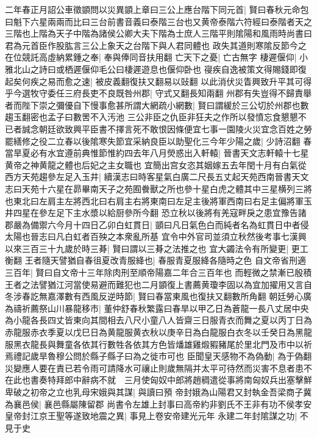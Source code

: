 二年春正月詔公車徵顗問以災異顗上章曰三公上應台階下同元首|{
	賢曰春秋元命包曰魁下六星兩兩而比曰三台前書音義曰泰階三台也又黄帝泰階六符經曰泰階者天之三階也上階為天子中階為諸侯公卿大夫下階為士庶人三階平則隂陽和風雨時尚書曰君為元首臣作股肱言三公上象天之台階下與人君同體也}
政失其道則寒隂反節今之在位競託高虛納累鍾之奉|{
	奉與俸同音扶用翻}
亡天下之憂|{
	亡古無字}
棲遲偃仰|{
	小雅北山之詩曰或栖遲偃仰毛公曰棲遲遊息也偃仰卧也}
寑疾自逸被策文得賜錢即復起矣何疾之易而愈之速|{
	被皮義翻復扶又翻易以䜴翻}
以此消伏災眚興致升平其可得乎今選牧守委任三府長吏不良既咎州郡|{
	守式又翻長知兩翻}
州郡有失豈得不歸責舉者而陛下崇之彌優自下慢事愈甚所謂大網疏小網數|{
	賢曰謂緩於三公切於州郡也數趨玉翻密也孟子曰數罟不入汚池}
三公非臣之仇臣非狂夫之作所以發憤忘食懇懇不已者誠念朝廷欲致興平臣書不擇言死不敢恨因條便宜七事一園陵火災宜念百姓之勞罷繕修之役二立春以後隂寒失節宜采納良臣以助聖化三今年少陽之歲|{
	少詩沼翻}
春當旱夏必有水宜遵前典惟節惟約四去年八月熒惑出入軒轅|{
	晉書天文志軒轅十七星黄帝之神黄龍之體也后妃之主女職也}
宜簡出宫女恣其姻嫁五去年閏十月有白氣從西方天苑趨參左足入玉井|{
	續漢志曰時客星氣白廣二尺長五丈起天苑西南晉書天文志曰天苑十六星在昴畢南天子之苑囿餋獸之所也參十星白虎之體其中三星横列三將也東北曰左肩主左將西北曰右肩主右將東南曰左足主後將軍西南曰右足主偏將軍玉井四星在參左足下主水漿以給厨參所今翻}
恐立秋以後將有羌寇畔戾之患宜豫告諸郡嚴為備禦六今月十四日乙卯白虹貫日|{
	顗曰凡日氣色白而純者名為虹貫日中者侵太陽也晉志曰凡白虹者百殃之本衆亂所基}
宜令中外官司並須立秋然後考事七漢興以來三百三十九歲於時三朞|{
	賢曰謂以三朞之法推之也}
宜大蠲法令有所變更|{
	更工衡翻}
王者隨天譬猶自春徂夏改青服絳也|{
	春服青夏服絳各隨時之色}
自文帝省刑適三百年|{
	賢曰自文帝十三年除肉刑至順帝陽嘉二年合三百年也}
而輕微之禁漸已殷積王者之法譬猶江河當使易避而難犯也二月顗復上書薦黄瓊李固以為宜加擢用又言自冬涉春訖無嘉澤數有西風反逆時節|{
	賢曰春當東風也復扶又翻數所角翻}
朝廷勞心廣為禱祈薦祭山川暴龍移市|{
	董仲舒春秋繁露曰春旱以甲乙日為蒼龍一長八丈居中央為小龍各長四丈皆東向其間相去八尺小童八人皆齋三日服青衣而舞之夏以丙丁日為赤龍服赤衣季夏以戊巳日為黄龍服黄衣秋以庚辛日為白龍服白衣冬以壬癸日為黑龍服黑衣龍長與舞童各依其行數牲各依其方色皆燔雄雞煅豭豬尾於里北門及市中以祈焉禮記歲旱魯穆公問於縣子縣子曰為之徙市可也}
臣聞皇天感物不為偽動|{
	為于偽翻}
災變應人要在責已若令雨可請降水可禳止則歲無隔并太平可待然而災害不息者患不在此也書奏特拜郎中辭病不就　三月使匈奴中郎將趙稠遣從事將南匈奴兵出塞擊鮮卑破之初帝之立也乳母宋娥與其謀|{
	與讀曰預}
帝封娥為山陽君又封執金吾梁商子冀為襄邑侯|{
	襄邑縣屬陳留郡}
尚書令左雄上封事曰高帝約非劉氏不王非有功不侯孝安皇帝封江京王聖等遂致地震之異|{
	事見上卷安帝建光元年}
永建二年封隂謀之功|{
	不見于史}
